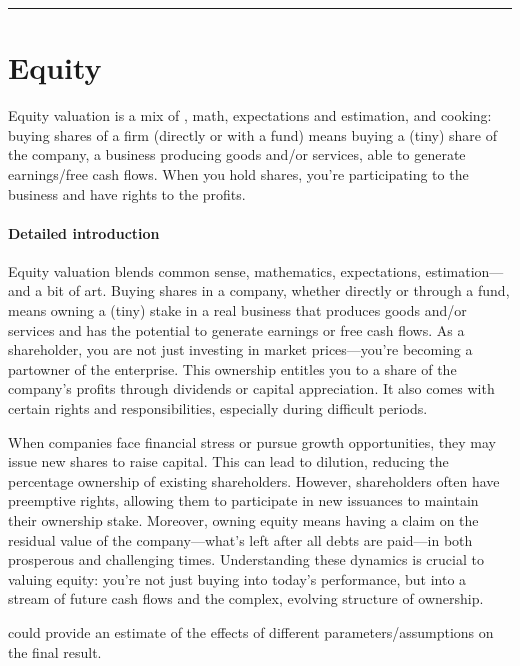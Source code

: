 \documentclass[letterpaper,10pt,english]{jupyterBook}
\begin{document}
\bigskip\hrule\bigskip


\sphinxstepscope


\chapter{Equity}
\label{\detokenize{ch/assets/equity:equity}}\label{\detokenize{ch/assets/equity:fin-edu-assets-equity}}\label{\detokenize{ch/assets/equity::doc}}
\sphinxAtStartPar
Equity valuation is a mix of , math, expectations and estimation, and cooking: buying shares of a firm (directly or with a fund) means buying a (tiny) share of the company, a business producing goods and/or services, able to generate earnings/free cash flows. When you hold shares, you’re participating to the business and have rights to the profits.
\subsubsection*{Detailed introduction}

\sphinxAtStartPar
Equity valuation blends common sense, mathematics, expectations, estimation—and a bit of art. Buying shares in a company, whether directly or through a fund, means owning a (tiny) stake in a real business that produces goods and/or services and has the potential to generate earnings or free cash flows. As a shareholder, you are not just investing in market prices—you’re becoming a part\sphinxhyphen{}owner of the enterprise. This ownership entitles you to a share of the company’s profits through dividends or capital appreciation. It also comes with certain rights and responsibilities, especially during difficult periods.

\sphinxAtStartPar
When companies face financial stress or pursue growth opportunities, they may issue new shares to raise capital. This can lead to dilution, reducing the percentage ownership of existing shareholders. However, shareholders often have preemptive rights, allowing them to participate in new issuances to maintain their ownership stake. Moreover, owning equity means having a claim on the residual value of the company—what’s left after all debts are paid—in both prosperous and challenging times. Understanding these dynamics is crucial to valuing equity: you’re not just buying into today’s performance, but into a stream of future cash flows and the complex, evolving structure of ownership.

\sphinxAtStartPar
{} could provide an estimate of the effects of different parameters/assumptions on the final result.
\end{document}

